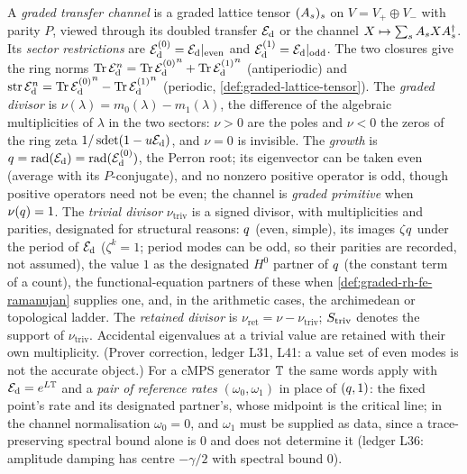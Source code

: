 \begin{definition}
\label{def:graded-transfer-channel}
A \emph{graded transfer channel} is a graded lattice tensor $(A_{s})_s$ on $V = V_+\oplus V_-$
with parity $P$, viewed through its doubled transfer $\mathcal E_{\mathrm d}$ or the channel $X\mapsto\sum_sA_{s}X
A_{s}^\dagger$. Its \emph{sector restrictions} are ${\mathcal E_{\mathrm d}^{(0)}} = \mathcal E_{\mathrm d}|_{\mathrm{even}}$ and
${\mathcal E_{\mathrm d}^{(1)}} = \mathcal E_{\mathrm d}|_{\mathrm{odd}}$. The two closures give the ring norms $\operatorname{Tr}\mathcal E_{\mathrm d}^n = \operatorname{Tr}{\mathcal E_{\mathrm d}^{(0)}}^n
+\operatorname{Tr}{\mathcal E_{\mathrm d}^{(1)}}^n$ (antiperiodic) and $\operatorname{str}\mathcal E_{\mathrm d}^n = \operatorname{Tr}{\mathcal E_{\mathrm d}^{(0)}}^n-\operatorname{Tr}{\mathcal E_{\mathrm d}^{(1)}}^n$ (periodic,
\cref{def:graded-lattice-tensor}). The \emph{graded divisor} is $\nu(\lambda) = m_0(\lambda)-
m_1(\lambda)$, the difference of the algebraic multiplicities of $\lambda$ in the two sectors:
$\nu>0$ are the poles and $\nu<0$ the zeros of the ring zeta $1/\operatorname{sdet}(1-u\mathcal E_{\mathrm d})$, and $\nu = 0$
is invisible. The \emph{growth} is $q = \operatorname{rad}(\mathcal E_{\mathrm d}) = \operatorname{rad}({\mathcal E_{\mathrm d}^{(0)}})$, the Perron root; its
eigenvector can be taken even (average with its $P$-conjugate), and no nonzero positive
operator is odd, though positive operators need not be even; the channel is \emph{graded
primitive} when $\nu(q) = 1$. The \emph{trivial divisor} $\nu_{\mathrm{triv}}$ is a signed divisor, with
multiplicities and parities, designated for structural reasons: $q$ (even, simple), its images
$\zeta q$ under the period of $\mathcal E_{\mathrm d}$ ($\zeta^k = 1$; period modes can be odd, so their parities
are recorded, not assumed), the value $1$ as the designated $H^0$ partner of $q$ (the constant
term of a count), the functional-equation partners of these when \cref{def:graded-rh-fe-ramanujan}
supplies one, and, in the arithmetic cases, the archimedean or topological ladder. The
\emph{retained divisor} is $\nu_{\mathrm{ret}} = \nu-\nu_{\mathrm{triv}}$; $S_{\mathrm{triv}}$ denotes
the support of $\nu_{\mathrm{triv}}$. Accidental eigenvalues at a trivial value are retained with
their own multiplicity. (Prover correction, ledger L31, L41: a value set of even modes is not the
accurate object.) For a cMPS generator $\mathbb T$ the same words apply
with $\mathcal E_{\mathrm d} = e^{L\mathbb T}$ and a \emph{pair of reference rates} $(\omega_0,\omega_1)$ in place of
$(q,1)$: the fixed point's rate and its designated partner's, whose midpoint is the critical
line; in the channel normalisation $\omega_0 = 0$, and $\omega_1$ must be supplied as data, since
a trace-preserving spectral bound alone is $0$ and does not determine it (ledger L36: amplitude
damping has centre $-\gamma/2$ with spectral bound $0$).
\end{definition}

